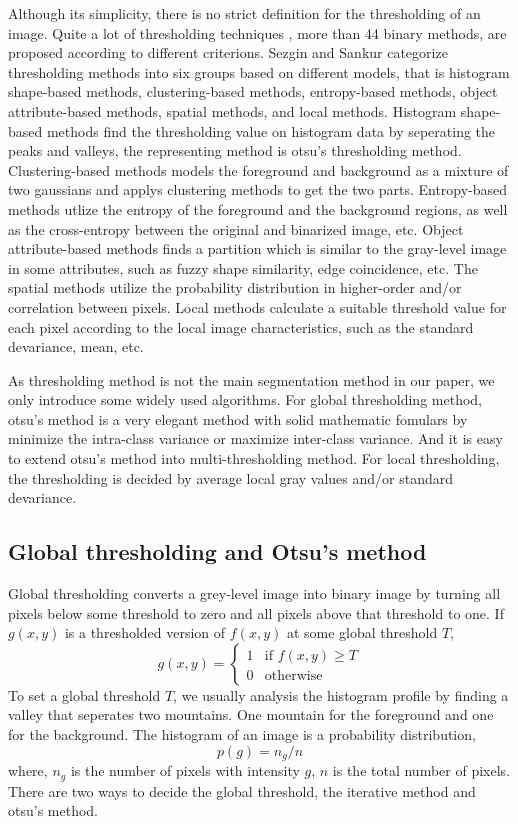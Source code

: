 Although its simplicity, there is no strict definition for the thresholding of an image. Quite a lot of thresholding techniques \cite{sahoo1988survey, sankur2001image, sezgin2004survey}, more than 44 binary methods, are proposed according to different criterions. Sezgin and Sankur \cite{sankur2001image, sezgin2004survey} categorize thresholding methods into six groups based on different models, that is histogram shape-based methods, clustering-based methods, entropy-based methods, object attribute-based methods, spatial methods, and local methods. Histogram shape-based methods find the thresholding value on histogram data by seperating the peaks and valleys, the representing method is otsu's thresholding method. Clustering-based methods models the foreground and background as a mixture of two gaussians and applys clustering methods to get the two parts. Entropy-based methods utlize the entropy of the foreground and the background regions, as well as the cross-entropy between the original and binarized image, etc. Object attribute-based methods finds a partition which is similar to the gray-level image in some attributes, such as fuzzy shape similarity, edge coincidence, etc. The spatial methods utilize the probability distribution in higher-order and/or correlation between pixels. Local methods calculate a suitable threshold value for each pixel according to the local image characteristics, such as the standard devariance, mean, etc.

As thresholding method is not the main segmentation method in our paper, we only introduce some widely used algorithms. For global thresholding method, otsu's method \cite{otsu1975threshold} is a very elegant method with solid mathematic fomulars by minimize the intra-class variance or maximize inter-class variance. And it is easy to extend otsu's method into multi-thresholding method. For local thresholding, the thresholding is decided by average local gray values and/or standard devariance. 
\subsection{Global thresholding and Otsu's method}
Global thresholding converts a grey-level image into binary image by turning all pixels below some threshold to zero and all pixels above that threshold to one. If $g(x,y)$ is a thresholded version of $f(x,y)$ at some global threshold $T$, 
\begin{equation}
g(x,y) = \left\{
  \begin{array}{ll}
  1 & \mbox{if } f(x,y) \ge T \\
  0 & \mbox{otherwise}
  \end{array}
  \right.
\end{equation}
To set a global threshold $T$, we usually analysis the histogram profile by finding a valley that seperates two mountains. One mountain for the foreground and one for the background. The histogram of an image is a probability distribution,
\begin{equation}
p(g) = n_g/n
\end{equation}
where, $n_g$ is the number of pixels with intensity $g$, $n$ is the total number of pixels. There are two ways to decide the global threshold, the iterative method and otsu's method. 

